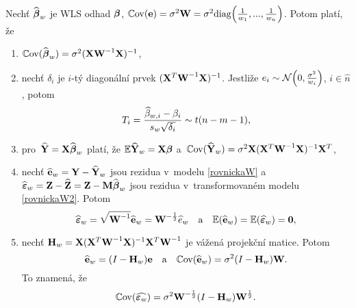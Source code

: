 \begin{theorem}
Nechť $\widehat{\boldsymbol{\beta}}_w$ je WLS odhad $\boldsymbol{\beta}$, $\mathbb{C}\mathrm{ov}(\mathbf{e}) = \sigma^2\textbf{W} = \sigma^2\mathrm{diag}\Big(\frac{1}{w_1},...,\frac{1}{w_n}\Big)$. Potom platí, že
\begin{enumerate}[1)]
	\item $\mathbb{C}\mathrm{ov}(\widehat{\boldsymbol{\beta}}_w) = \sigma^2{(\mathbf{X}{\textbf{W}^{-1}}\mathbf{X})^{-1}}$,
	\item nechť $\delta_i$ je $i$-tý diagonální prvek ${(\mathbf{X}^T{\textbf{W}^{-1}}\mathbf{X})^{-1}}$. Jestliže $e_i\sim \mathcal{N}\Big(0,\frac{\sigma^2}{w_i}\Big)$, $i\in\widehat{n}$, potom
	 $$ T_i = \frac{\widehat{\beta}_{w,i}-\beta_i}{s_w\sqrt{\delta_i}}\sim t(n-m-1), $$
	\item pro~$\widehat{\mathbf{Y}} = \mathbf{X}\widehat{\boldsymbol{\beta}}_w$ platí, že $\mathbb{E} \widehat{\mathbf{Y}}_w = \mathbf{X}\boldsymbol{\beta}$ a~$\mathbb{C}\mathrm{ov}(\widehat{\mathbf{Y}}_w) = \sigma^2\mathbf{X}{(\mathbf{X}^T{\textbf{W}^{-1}}\mathbf{X})^{-1}}\mathbf{X}^T$,
\item nechť $\widehat{\mathbf{e}}_w = \mathbf{Y}-\widehat{\mathbf{Y}}_w$ jsou rezidua v~modelu \eqref{rovnickaW} a~$\widehat{\boldsymbol{\varepsilon}}_w = \textbf{Z}-\widehat{\textbf{Z}} = \textbf{Z}-\textbf{M}\widehat{\boldsymbol{\beta}}_w$ jsou rezidua v~transformovaném modelu \eqref{rovnickaW2}. Potom
 $$ \widehat{\boldsymbol{\varepsilon}}_w = \sqrt{{\textbf{W}^{-1}}}\widehat{\mathbf{e}}_w = \textbf{W}^{-\frac{1}{2}}\widehat{e}_w\quad\text{a}\quad \mathbb{E}(\widehat{\mathbf{e}}_w) = \mathbb{E}(\boldsymbol{\widehat{\varepsilon}}_w) = \boldsymbol{0}, $$
\item nechť $\textbf{H}_w = \mathbf{X}{(\mathbf{X}^T{\textbf{W}^{-1}}\mathbf{X})^{-1}}\mathbf{X}^T{\textbf{W}^{-1}}$ je vážená projekční matice. Potom
 $$ \widehat{\mathbf{e}}_w = (I-\textbf{H}_w)\mathbf{e}\quad\text{a}\quad \mathbb{C}\mathrm{ov}(\widehat{\mathbf{e}}_w) = \sigma^2(I-\textbf{H}_w)\textbf{W}. $$
To znamená, že $$ \mathbb{C}\mathrm{ov}(\widehat{\boldsymbol{\varepsilon}_w}) = \sigma^2\textbf{W}^{-\frac{1}{2}}(I-\textbf{H}_w)\textbf{W}^{\frac{1}{2}}. $$
\end{enumerate}


\end{theorem}
